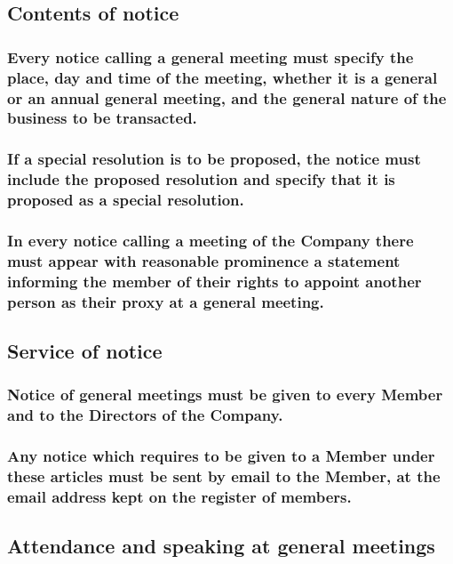 \documentclass[12pt]{article}
\begin{document}
\subsection[Contents of notice of general meetings]{Contents of notice}
\subsubsection[Notices must include details]{Every notice calling a general meeting must specify the place, day and time of the meeting, whether it is a general or an annual general meeting, and the general nature of the business to be transacted.}
\subsubsection[Notices must include any special resolutions]{If a special resolution is to be proposed, the notice must include the proposed resolution and specify that it is proposed as a special resolution.}
\subsubsection[Notices of general meetings must state that proxies may be appointed]{In every notice calling a meeting of the Company there must appear with reasonable prominence a statement informing the member of their rights to appoint another person as their proxy at a general meeting.}

\subsection{Service of notice}
\subsubsection[Notices must be communicated to all Members]{Notice of general meetings must be given to every Member and to the Directors of the Company.}
\subsubsection[Notices must be sent by email]{Any notice which requires to be given to a Member under these articles must be sent by email to the Member, at the email address kept on the register of members.}

\subsection{Attendance and speaking at general meetings}
\end{document}
